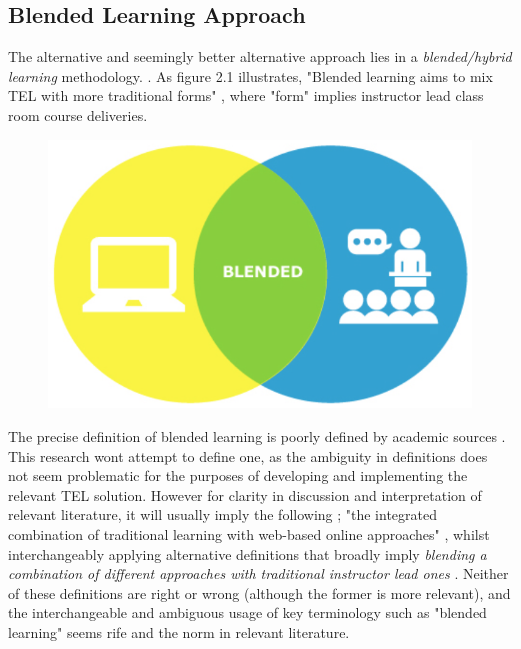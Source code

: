 \subsection{Blended Learning Approach}
\label{subsec:subsec01}

The alternative and seemingly better alternative approach lies in a \textit{blended/hybrid learning} methodology. \cite{Means2009,RickReis,Gordon2014}. As figure 2.1 illustrates, "Blended learning aims to mix TEL with more traditional forms" \cite{Gordon2014}, where "form" implies instructor lead class room course deliveries\cite{RickReis,Means2009}.

\begin{figure}[H]
	\centering
	\includegraphics[height=0.35\textheight]{figures/blendedLearning}
	\label{fig:Blended Learning}
\end{figure}

The precise definition of blended learning is poorly defined by academic sources \cite{Oliver2005}. This research wont attempt to define one, as the ambiguity in definitions does not seem problematic for the purposes of developing and implementing the relevant TEL solution. However for clarity in discussion and interpretation of relevant literature, it will usually imply the following ; "the integrated combination of traditional learning with web-based online approaches" \cite{Oliver2005}, whilst interchangeably applying alternative definitions that broadly imply \textit{blending a combination of different approaches with traditional instructor lead ones} \cite{Oliver2005,Sana2011}. Neither of these definitions are right or wrong (although the former is more relevant), and the interchangeable and ambiguous usage of key terminology such as "blended learning" seems rife and the norm in relevant literature\cite{Oliver2005,Sana2011}.

